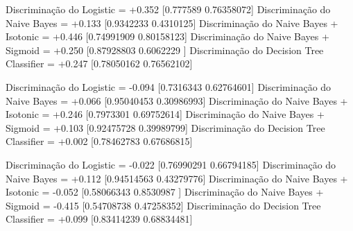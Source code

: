 Discriminação do Logistic = +0.352
[0.777589   0.76358072]
Discriminação do Naive Bayes = +0.133
[0.9342233 0.4310125]
Discriminação do Naive Bayes + Isotonic = +0.446
[0.74991909 0.80158123]
Discriminação do Naive Bayes + Sigmoid = +0.250
[0.87928803 0.6062229 ]
Discriminação do Decision Tree Classifier = +0.247
[0.78050162 0.76562102]

Discriminação do Logistic = -0.094
[0.7316343  0.62764601]
Discriminação do Naive Bayes = +0.066
[0.95040453 0.30986993]
Discriminação do Naive Bayes + Isotonic = +0.246
[0.7973301  0.69752614]
Discriminação do Naive Bayes + Sigmoid = +0.103
[0.92475728 0.39989799]
Discriminação do Decision Tree Classifier = +0.002
[0.78462783 0.67686815]

Discriminação do Logistic = -0.022
[0.76990291 0.66794185]
Discriminação do Naive Bayes = +0.112
[0.94514563 0.43279776]
Discriminação do Naive Bayes + Isotonic = -0.052
[0.58066343 0.8530987 ]
Discriminação do Naive Bayes + Sigmoid = -0.415
[0.54708738 0.47258352]
Discriminação do Decision Tree Classifier = +0.099
[0.83414239 0.68834481]

\begin{table}
    \centering
    \caption{Dataset de Reincidência Criminal sem pré-processamento.}
    \label{table:recindSemPP}
    \end{table}